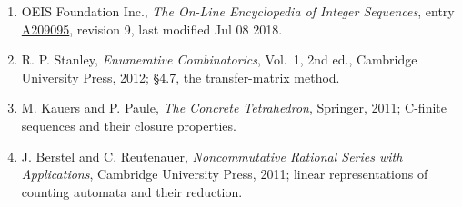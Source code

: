 \documentclass[11pt]{article}
\theoremstyle{definition}
\begin{document}
\begin{enumerate}

\item OEIS Foundation Inc., \emph{The On-Line Encyclopedia of Integer Sequences}, entry \href{https://oeis.org/A209095}{A209095}, revision 9, last modified Jul 08 2018.

\item R. P. Stanley, \emph{Enumerative Combinatorics}, Vol.~1, 2nd ed., Cambridge University Press, 2012; \S4.7, the transfer-matrix method.

\item M. Kauers and P. Paule, \emph{The Concrete Tetrahedron}, Springer, 2011; C-finite sequences and their closure properties.

\item J. Berstel and C. Reutenauer, \emph{Noncommutative Rational Series with Applications}, Cambridge University Press, 2011; linear representations of counting automata and their reduction.

\end{enumerate}
\end{document}
